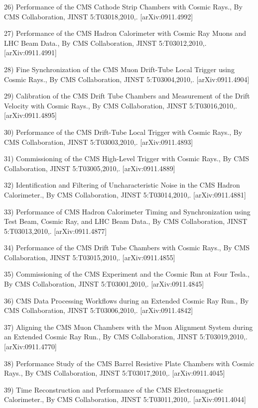 \documentclass[10pt]{article}
\newenvironment{outerlist}[1][\enskip\textbullet]%
        {\begin{itemize}[#1]}{\end{itemize}%
         \vspace{-.6\baselineskip}}
\newenvironment{innerlist}[1][\enskip\textbullet]%
        {\begin{compactitem}[#1]}{\end{compactitem}}
\begin{document}
\begin{outerlist}
\begin{innerlist}
\item 26) Performance of the CMS Cathode Strip Chambers with Cosmic Rays., By CMS Collaboration, JINST 5:T03018,2010,. [arXiv:0911.4992]
\item 27) Performance of the CMS Hadron Calorimeter with Cosmic Ray Muons and LHC Beam Data., By CMS Collaboration, JINST 5:T03012,2010,. [arXiv:0911.4991]
\item 28) Fine Synchronization of the CMS Muon Drift-Tube Local Trigger using Cosmic Rays., By CMS Collaboration, JINST 5:T03004,2010,. [arXiv:0911.4904]
\item 29) Calibration of the CMS Drift Tube Chambers and Measurement of the Drift Velocity with Cosmic Rays., By CMS Collaboration, JINST 5:T03016,2010,. [arXiv:0911.4895]
\item 30) Performance of the CMS Drift-Tube Local Trigger with Cosmic Rays., By CMS Collaboration, JINST 5:T03003,2010,. [arXiv:0911.4893]
\item 31) Commissioning of the CMS High-Level Trigger with Cosmic Rays., By CMS Collaboration, JINST 5:T03005,2010,. [arXiv:0911.4889]
\item 32) Identification and Filtering of Uncharacteristic Noise in the CMS Hadron Calorimeter., By CMS Collaboration, JINST 5:T03014,2010,. [arXiv:0911.4881]
\item 33) Performance of CMS Hadron Calorimeter Timing and Synchronization using Test Beam, Cosmic Ray, and LHC Beam Data., By CMS Collaboration, JINST 5:T03013,2010,. [arXiv:0911.4877]
\item 34) Performance of the CMS Drift Tube Chambers with Cosmic Rays., By CMS Collaboration, JINST 5:T03015,2010,. [arXiv:0911.4855]
\item 35) Commissioning of the CMS Experiment and the Cosmic Run at Four Tesla., By CMS Collaboration, JINST 5:T03001,2010,. [arXiv:0911.4845]
\item 36) CMS Data Processing Workflows during an Extended Cosmic Ray Run., By CMS Collaboration, JINST 5:T03006,2010,. [arXiv:0911.4842]
\item 37) Aligning the CMS Muon Chambers with the Muon Alignment System during an Extended Cosmic Ray Run., By CMS Collaboration, JINST 5:T03019,2010,. [arXiv:0911.4770]
\item 38) Performance Study of the CMS Barrel Resistive Plate Chambers with Cosmic Rays., By CMS Collaboration, JINST 5:T03017,2010,. [arXiv:0911.4045]
\item 39) Time Reconstruction and Performance of the CMS Electromagnetic Calorimeter., By CMS Collaboration, JINST 5:T03011,2010,. [arXiv:0911.4044]

\end{innerlist}
\end{outerlist}
\end{document}
